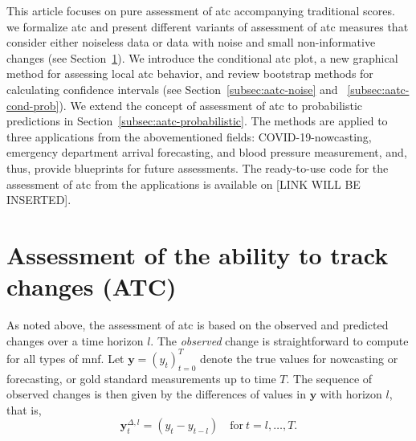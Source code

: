 \documentclass[pdflatex]{sn-jnl}
\theoremstyle{plain}%
\theoremstyle{definition}
\newcommand{\diffylt}{\mathbf{y}^{\Delta,l}_t}
\begin{document}
This article focuses on pure assessment of \ac{atc} accompanying traditional scores.
 we formalize \ac{atc} and present different variants of assessment of \ac{atc} measures that consider either noiseless data or data with noise and small non-informative changes (see Section~\ref{sec:aatc}).
We introduce the conditional \ac{atc} plot, a new graphical method for assessing local \ac{atc} behavior, and review bootstrap methods for calculating confidence intervals (see Section~\ref{subsec:aatc-noise} and ~\ref{subsec:aatc-cond-prob}).
We extend the concept of assessment of \ac{atc} to probabilistic predictions in Section~\ref{subsec:aatc-probabilistic}.
The methods are applied to three applications from the abovementioned fields: COVID-19-nowcasting, emergency department arrival forecasting, and blood pressure measurement, and, thus, provide blueprints for future assessments.
The ready-to-use code for the assessment of \ac{atc} from the applications is available on [LINK WILL BE INSERTED].


\section{Assessment of the ability to track changes (ATC)}\label{sec:aatc}


As noted above, the assessment of \ac{atc} is based on the observed and predicted changes over a time horizon $l$.
The \textit{observed} change is straightforward to compute for all types of \ac{mnf}.
Let $\mathbf{y} = (y_t)_{t=0}^T$ denote the true values for nowcasting or forecasting, or gold standard measurements up to time $T$.
The sequence of observed changes is then given by the differences of values in $\mathbf{y}$ with horizon $l$, that is,
\begin{equation}\label{eq:diffy}
    \diffylt = (y_{t} - y_{t-l}) \quad \text{for}\ t = l, \dots, T.
\end{equation}
\end{document}
